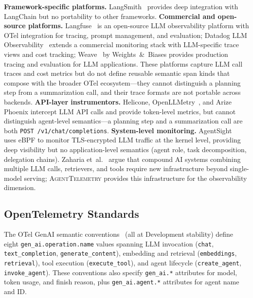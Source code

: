 \documentclass[sigplan,10pt,screen]{acmart}
\begin{document}
\textbf{Framework-specific platforms.}
LangSmith~\cite{langsmith} provides deep integration with LangChain
but no portability to other frameworks.
\textbf{Commercial and open-source platforms.}
Langfuse~\cite{langfuse} is an open-source LLM observability platform
with OTel integration for tracing, prompt management, and evaluation;
Datadog LLM Observability~\cite{datadog_llm} extends a commercial
monitoring stack with LLM-specific trace views and cost tracking;
Weave~\cite{weave} by Weights~\&~Biases provides production tracing
and evaluation for LLM applications.
These platforms capture LLM call traces and cost metrics but do not
define reusable semantic span kinds that compose with the broader OTel
ecosystem---they cannot distinguish a planning step from a
summarization call, and their trace formats are not portable across
backends.
\textbf{API-layer instrumentors.}
Helicone, OpenLLMetry~\cite{openllmetry}, and Arize Phoenix intercept
LLM API calls and provide token-level metrics, but cannot distinguish
agent-level semantics---a planning step and a summarization call are
both \texttt{POST /v1/chat/completions}.
\textbf{System-level monitoring.}
AgentSight~\cite{agentsight} uses eBPF to monitor TLS-encrypted LLM
traffic at the kernel level, providing deep visibility but no
application-level semantics (agent role, task decomposition, delegation
chains).
Zaharia et~al.~\cite{compound_ai} argue that compound AI systems
combining multiple LLM calls, retrievers, and tools require new
infrastructure beyond single-model serving; \textsc{AgentTelemetry}
provides this infrastructure for the observability dimension.

\subsection{OpenTelemetry Standards}

The OTel GenAI semantic conventions~\cite{otel} (all at Development
stability) define eight \texttt{gen\_ai.operation.name} values spanning
LLM invocation (\texttt{chat}, \texttt{text\_completion},
\texttt{generate\_content}), embedding and retrieval (\texttt{embeddings},
\texttt{retrieval}), tool execution (\texttt{execute\_tool}), and agent
lifecycle (\texttt{create\_agent}, \texttt{invoke\_agent}).  These
conventions also specify \texttt{gen\_ai.*} attributes for model, token
usage, and finish reason, plus \texttt{gen\_ai.agent.*} attributes for
agent name and ID.
\end{document}
